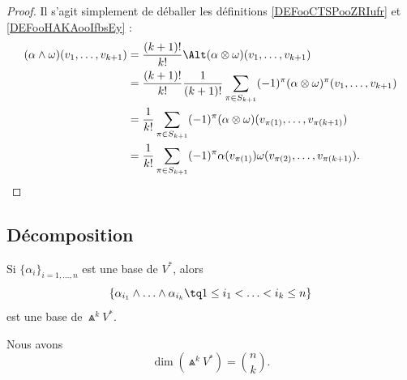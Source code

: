 \begin{proof}
	Il s'agit simplement de déballer les définitions \ref{DEFooCTSPooZRIufr} et \ref{DEFooHAKAooIfbsEy} :
	\begin{subequations}
		\begin{align}
			(\alpha\wedge\omega)(v_1,\ldots,v_{k+1}) & = \frac{ (k+1)! }{ k! }\Alt(\alpha\otimes \omega)(v_1,\ldots,v_{k+1})                                                  \\
			                                         & =\frac{ (k+1)! }{ k! }\frac{1}{ (k+1)!}\sum_{\pi\in S_{k+1}}(-1)^{\pi}(\alpha\otimes \omega)^{\pi}(v_1,\ldots,v_{k+1}) \\
			                                         & =\frac{1}{ k!}\sum_{\pi\in S_{k+1}}(-1)^{\pi}(\alpha\otimes \omega)(v_{\pi(1)},\ldots,v_{\pi(k+1)})                    \\
			                                         & =\frac{1}{ k!}\sum_{\pi\in S_{k+1}}(-1)^{\pi}\alpha(v_{\pi(1)})\omega(v_{\pi(2)},\ldots,v_{\pi(k+1)}).
		\end{align}
	\end{subequations}
\end{proof}

\subsection{Décomposition}


\begin{proposition}			\label{PROPooUGLOooTULnDK}
	Si \( \{ \alpha_i \}_{i=1,\ldots,n}\) est une base de \( V^*\), alors
	\begin{equation}
		\{ \alpha_{i_1}\wedge\ldots\wedge \alpha_{i_k}\tq 1\leq i_1< \ldots <i_k\leq n \}
	\end{equation}
	est une base de \( \Wedge^kV^*\).

	Nous avons
	\begin{equation}
		\dim(\Wedge^kV^*)=\binom{n}{k}.
	\end{equation}
\end{proposition}

